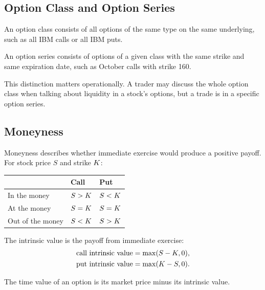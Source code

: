 \subsection{Option Class and Option Series}

\begin{defN}
An option class consists of all options of the same type on the same underlying,
such as all IBM calls or all IBM puts.
\end{defN}

\begin{defN}
An option series consists of options of a given class with the same strike and
same expiration date, such as October calls with strike 160.
\end{defN}

This distinction matters operationally. A trader may discuss the whole option
class when talking about liquidity in a stock's options, but a trade is in a
specific option series.

\subsection{Moneyness}

Moneyness describes whether immediate exercise would produce a positive payoff.
For stock price $S$ and strike $K$:
\begin{center}
\begin{tabular}{lll}
\toprule
 & Call & Put \\
\midrule
In the money & $S>K$ & $S<K$ \\
At the money & $S=K$ & $S=K$ \\
Out of the money & $S<K$ & $S>K$ \\
\bottomrule
\end{tabular}
\end{center}

\begin{defN}
The intrinsic value is the payoff from immediate exercise:
\[
    \begin{aligned}
    \text{call intrinsic value} &= \max(S-K,0),\\
    \text{put intrinsic value}  &= \max(K-S,0).
    \end{aligned}
\]
\end{defN}

\begin{defN}
The time value of an option is its market price minus its intrinsic value.
\end{defN}


